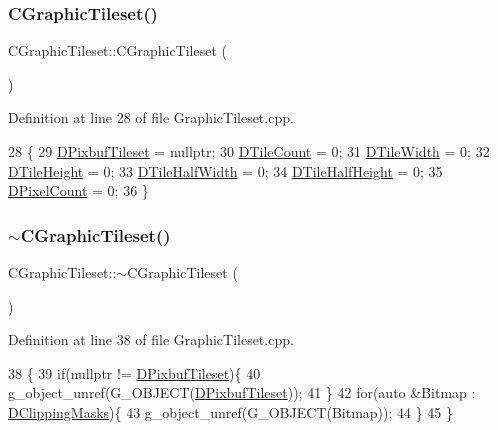 \subsubsection{\texorpdfstring{C\+Graphic\+Tileset()}{CGraphicTileset()}}
{\footnotesize\ttfamily C\+Graphic\+Tileset\+::\+C\+Graphic\+Tileset (\begin{DoxyParamCaption}{ }\end{DoxyParamCaption})}



Definition at line 28 of file Graphic\+Tileset.\+cpp.


\begin{DoxyCode}
28                                 \{
29     \hyperlink{classCGraphicTileset_a5d5adfcdbb347a6df3f57535ca08e3ef}{DPixbufTileset} = \textcolor{keyword}{nullptr};
30     \hyperlink{classCGraphicTileset_a39d942b370e47f441bf97385eb1037c8}{DTileCount} = 0;
31     \hyperlink{classCGraphicTileset_a2d0c7d19865b81911a3a43d5cae50e00}{DTileWidth} = 0;
32     \hyperlink{classCGraphicTileset_af48f32e07d5fe69afd5f764318cc3244}{DTileHeight} = 0;
33     \hyperlink{classCGraphicTileset_a3e82808009078ce29f6b74bcd077b251}{DTileHalfWidth} = 0;
34     \hyperlink{classCGraphicTileset_a16c8bc4e4c8738fe561b0408cd40ccef}{DTileHalfHeight} = 0;
35     \hyperlink{classCGraphicTileset_a55fc9ceb1c92383c124e61c911fe57db}{DPixelCount} = 0;
36 \}
\end{DoxyCode}
\hypertarget{classCGraphicTileset_ab80f78214ec2ec7da8eef15e8e0f523d}{}\label{classCGraphicTileset_ab80f78214ec2ec7da8eef15e8e0f523d} 
\subsubsection{\texorpdfstring{$\sim$\+C\+Graphic\+Tileset()}{~CGraphicTileset()}}
{\footnotesize\ttfamily C\+Graphic\+Tileset\+::$\sim$\+C\+Graphic\+Tileset (\begin{DoxyParamCaption}{ }\end{DoxyParamCaption})\hspace{0.3cm}{\ttfamily [virtual]}}



Definition at line 38 of file Graphic\+Tileset.\+cpp.


\begin{DoxyCode}
38                                  \{
39     \textcolor{keywordflow}{if}(\textcolor{keyword}{nullptr} != \hyperlink{classCGraphicTileset_a5d5adfcdbb347a6df3f57535ca08e3ef}{DPixbufTileset})\{
40         g\_object\_unref(G\_OBJECT(\hyperlink{classCGraphicTileset_a5d5adfcdbb347a6df3f57535ca08e3ef}{DPixbufTileset}));
41     \}
42     \textcolor{keywordflow}{for}(\textcolor{keyword}{auto} &Bitmap : \hyperlink{classCGraphicTileset_a3761aec1b9a8bf189da5a7202d7fcac9}{DClippingMasks})\{
43         g\_object\_unref(G\_OBJECT(Bitmap));
44     \}
45 \}
\end{DoxyCode}


